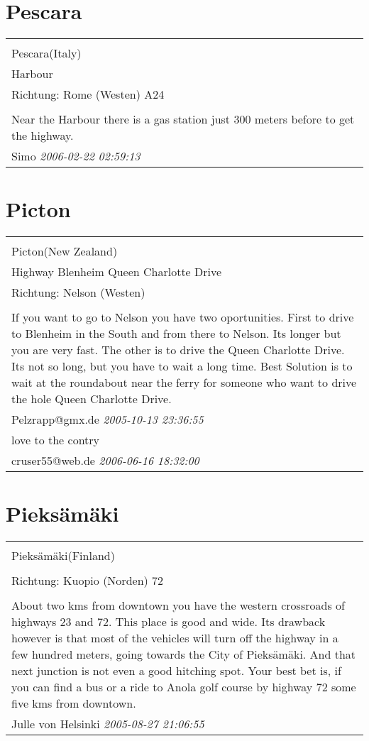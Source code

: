 \documentclass[a4paper,12pt]{article}
\begin{document}
\section{Pescara}
\begin{tabular}{|p{13cm}|}
\hline\\
Pescara(Italy)\\
Harbour\\
Richtung: Rome (Westen) A24 \\
\hline\\
Near the Harbour there is a gas station just 300 meters before to get the highway. \\
Simo \textit{ 2006-02-22 02:59:13 }\\\hline
\end{tabular}


\section{Picton}
\begin{tabular}{|p{13cm}|}
\hline\\
Picton(New Zealand)\\
Highway Blenheim Queen Charlotte Drive\\
Richtung: Nelson (Westen) \\
\hline\\
If you want to go to Nelson you have two oportunities. First to drive to Blenheim in the South and from there to Nelson. Its longer but you are very fast. The other is to drive the Queen Charlotte Drive. Its not so long, but you have to wait a long time. Best Solution is to wait at the roundabout near the ferry for someone who want to drive the hole Queen Charlotte Drive. \\
Pelzrapp@gmx.de \textit{ 2005-10-13 23:36:55 }\\\hline love to the contry \\
cruser55@web.de \textit{ 2006-06-16 18:32:00 }\\\hline
\end{tabular}


\section{Pieksämäki}
\begin{tabular}{|p{13cm}|}
\hline\\
Pieksämäki(Finland)\\
\\
Richtung: Kuopio (Norden) 72 \\
\hline\\
About two kms from downtown you have the western crossroads of highways 23 and 72. This place is good and wide. Its drawback however is that most of the vehicles will turn off the highway in a few hundred meters, going towards the City of Pieksämäki. And that next junction is not even a good hitching spot. Your best bet is, if you can find a bus or a ride to Anola golf course by highway 72 some five kms from downtown. \\
Julle von Helsinki \textit{ 2005-08-27 21:06:55 }\\\hline
\end{tabular}
\end{document}
